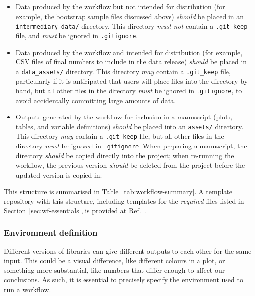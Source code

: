 \documentclass{article}
\newcommand\rfcword[1]{\emph{#1}\xspace}
\newcommand\must{\rfcword{must}}
\newcommand\mustnot{\rfcword{must not}}
\newcommand\required{\rfcword{required}}
\newcommand\should{\rfcword{should}}
\newcommand\may{\rfcword{may}}
\newcommand\filename[1]{\texttt{#1}\xspace}
\begin{document}
\begin{itemize}
        Files containing metadata and analysis parameters
        \should be placed in a \filename{metadata/} directory.
        This directory \may contain a \filename{.git\_keep} file,
        but all other files in the directory \must be ignored in \filename{.gitignore}.
  \item
        Data produced by the workflow but not intended for distribution
        (for example,
        the bootstrap sample files discussed above)
        \should be placed in an \filename{intermediary\_data/} directory.
        This directory \mustnot contain a \filename{.git\_keep} file,
        and \must be ignored in \filename{.gitignore}.
  \item
        Data produced by the workflow and intended for distribution
        (for example,
        CSV files of final numbers to include in the data release)
        \should be placed in a \filename{data\_assets/} directory.
        This directory \may contain a \filename{.git\_keep} file,
        particularly if it is anticipated that users will place files into the directory by hand,
        but all other files in the directory \must be ignored in \filename{.gitignore},
        to avoid accidentally committing large amounts of data.
  \item
        Outputs generated by the workflow for inclusion in a manuscript
        (plots, tables, and variable definitions)
        \should be placed into an \filename{assets/} directory.
        This directory \may contain a \filename{.git\_keep} file,
        but all other files in the directory \must be ignored in \filename{.gitignore}.
        When preparing a manuscript,
        the directory \should be copied directly into the project;
        when re-running the workflow,
        the previous version \should be deleted from the project
        before the updated version is copied in.
\end{itemize}

This structure is summarised in Table~\ref{tab:workflow-summary}.
A template repository with this structure,
including templates for the \required files listed in Section~\ref{sec:wf-essentials},
is provided at Ref.~\cite{workflow-template}.

\subsubsection{Environment definition}

Different versions of libraries can give different outputs to each other
for the same input.
This could be a visual difference,
like different colours in a plot,
or something more substantial,
like numbers that differ enough to affect our conclusions.
As such,
it is essential to precisely specify the environment used to run a workflow.
\end{document}
